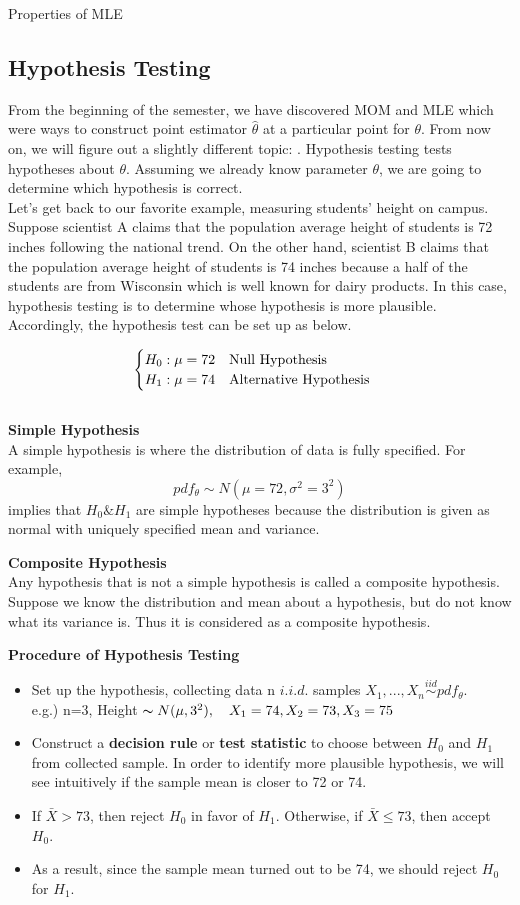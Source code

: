 \documentclass[12pt]{article}
\begin{document}
\begin{section}{Properties of MLE}
\section{Hypothesis Testing}
From the beginning of the semester, we have discovered MOM and MLE which were ways to construct point estimator $\hat{\theta}$ at a particular point for $\theta$. From now on, we will figure out a slightly different topic: . Hypothesis testing tests hypotheses about $\theta$. Assuming we already know parameter $\theta$, we are going to determine which hypothesis is correct.\\

Let's get back to our favorite example, measuring students' height on campus. Suppose scientist A claims that the population average height of students is 72 inches following the national trend. On the other hand, scientist B claims that the population average height of students is 74 inches because a half of the students are from Wisconsin which is well known for dairy products. In this case, hypothesis testing is to determine whose hypothesis is more plausible. Accordingly, the hypothesis test can be set up as below.

$$\begin{cases}
H_0: \mu = 72 \text{\quad Null Hypothesis}\\
H_1: \mu = 74 \text{\quad Alternative Hypothesis}
\end{cases}$$\\

\textbf{Simple Hypothesis}\\
A simple hypothesis is where the distribution of data is fully specified. For example,
$$pdf_\theta \sim N(\mu=72, \sigma^2 = 3^2)$$
implies that $H_0 \& H_1$ are simple hypotheses because the distribution is given as normal with uniquely specified mean and variance.

\textbf{Composite Hypothesis}\\
Any hypothesis that is not a simple hypothesis is called a composite hypothesis. Suppose we know the distribution and mean about a hypothesis, but do not know what its variance is. Thus it is considered as a composite hypothesis.

\textbf{Procedure of Hypothesis Testing}
\begin{itemize}
	\item Set up the hypothesis, collecting data n $i.i.d.$ samples $X_1,...,X_n \stackrel{iid}{\sim} pdf_\theta$.\\
    e.g.) n=3, Height $\thicksim N(\mu,3^2), \quad X_1=74, X_2=73, X_3=75$
   \item Construct a \textbf{decision rule} or \textbf{test statistic} to choose between $H_0$ and $H_1$ from collected sample. In order to identify more plausible hypothesis, we will see intuitively if the sample mean is closer to 72 or 74.
   	\item If $\bar{X}>73$, then reject $H_0$ in favor of $H_1$. Otherwise, if $\bar{X} \leq 73$, then accept $H_0$.   
    \item As a result, since the sample mean turned out to be 74, we should reject $H_0$ for $H_1$.
\end{itemize}


\end{section}
\end{document}
